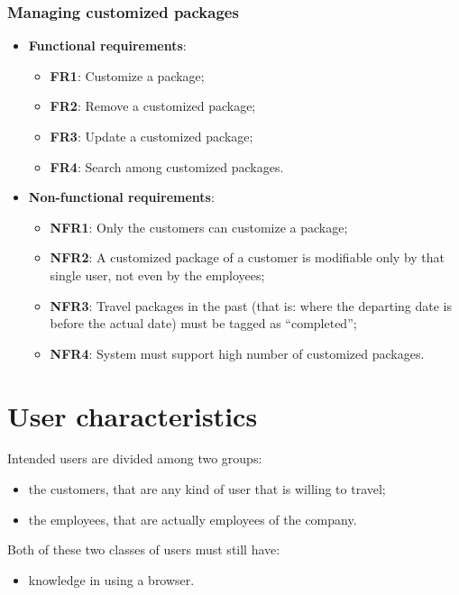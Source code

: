 \documentclass[a4paper,12pt]{book}
\begin{document}
\subsubsection{Managing customized packages}
\begin{itemize}
  \item \textbf{Functional requirements}:
  \begin{itemize}[noitemsep]
    \item \textbf{FR1}: Customize a package;
    \item \textbf{FR2}: Remove a customized package;
    \item \textbf{FR3}: Update a customized package;
    \item \textbf{FR4}: Search among customized packages.
  \end{itemize}
  \item \textbf{Non-functional requirements}:
  \begin{itemize}[noitemsep]
    \item \textbf{NFR1}: Only the customers can customize a package;
    \item \textbf{NFR2}: A customized package of a customer is modifiable only by that single user, not even by the employees;
    \item \textbf{NFR3}: Travel packages in the past (that is: where the departing date is before the actual date) must be tagged as ``completed'';
    \item \textbf{NFR4}: System must support high number of customized packages.
  \end{itemize}
\end{itemize}

\section{User characteristics}
Intended users are divided among two groups:
\begin{itemize}[noitemsep]
  \item the customers, that are any kind of user that is willing to travel;
  \item the employees, that are actually employees of the company.
\end{itemize}
Both of these two classes of users must still have:
\begin{itemize}[noitemsep]
  \item knowledge in using a browser.
\end{itemize}
\end{document}
